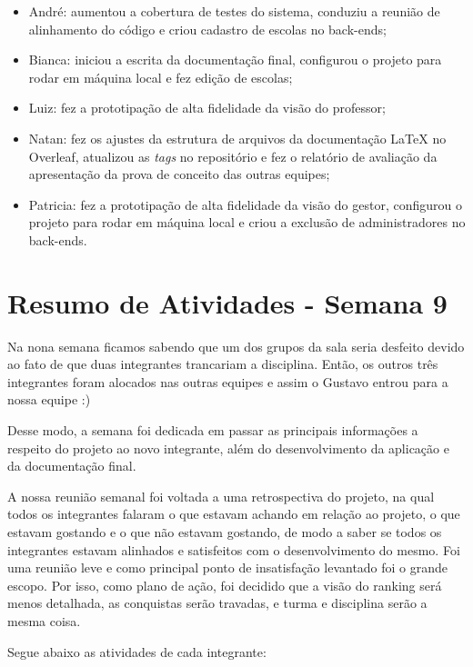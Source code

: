 \begin{apendicesenv}
\begin{itemize}
\item André: aumentou a cobertura de testes do sistema, conduziu a reunião de alinhamento do código e criou cadastro de escolas no \glspl{back-end};
\item Bianca: iniciou a escrita da documentação final, configurou o projeto para rodar em máquina local e fez edição de escolas;
\item Luiz: fez a prototipação de alta fidelidade da visão do professor;
\item Natan: fez os ajustes da estrutura de arquivos da documentação LaTeX no Overleaf, atualizou as \textit{tags} no repositório e fez o relatório de avaliação da apresentação da prova de conceito das outras equipes; 
\item Patricia: fez a prototipação de alta fidelidade da visão do gestor, configurou o projeto para rodar em máquina local e criou a exclusão de administradores no \glspl{back-end}.
\end{itemize}

\section{Resumo de Atividades - Semana 9}
Na nona semana ficamos sabendo que um dos grupos da sala seria desfeito devido ao fato de que duas integrantes trancariam a disciplina. Então, os outros três integrantes foram alocados nas outras equipes e assim o Gustavo entrou para a nossa equipe :)

Desse modo, a semana foi dedicada em passar as principais informações a respeito do projeto ao novo integrante, além do desenvolvimento da aplicação e da documentação final.

A nossa reunião semanal foi voltada a uma retrospectiva do projeto, na qual todos os integrantes falaram o que estavam achando em relação ao projeto, o que estavam gostando e o que não estavam gostando, de modo a saber se todos os integrantes estavam alinhados e satisfeitos com o desenvolvimento do mesmo. Foi uma reunião leve e como principal ponto de insatisfação levantado foi o grande escopo. Por isso, como plano de ação, foi decidido que a visão do \gls{ranking} será menos detalhada, as conquistas serão travadas, e turma e disciplina serão a mesma coisa.

Segue abaixo as atividades de cada integrante:


\end{apendicesenv}
